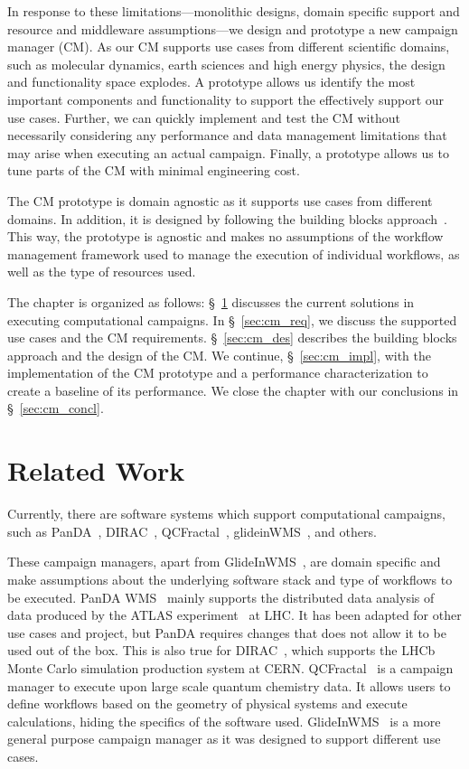 In response to these limitations---monolithic designs, domain specific support 
and resource and middleware assumptions---we design and prototype a new 
campaign manager (CM). As our CM supports use cases from 
different scientific domains, such as molecular dynamics, earth sciences and 
high energy physics, the design and functionality space explodes. A prototype 
allows us identify the most important components and functionality to support 
the effectively support our use cases. Further, we can quickly implement and 
test the CM without necessarily considering any performance and 
data management limitations that may arise when executing an actual campaign.
Finally, a prototype allows us to tune parts of the CM with 
minimal engineering cost.

The CM prototype is domain agnostic as it supports use cases 
from different domains. In addition, it is designed by following the building 
blocks approach~\cite{turilli2019middleware}. This way, the prototype is 
agnostic and makes no assumptions of the workflow management framework used to 
manage the execution of individual workflows, as well as the type of resources 
used.

The chapter is organized as follows: \S~\ref{sec:cm_rw} discusses the current
solutions in executing computational campaigns. In \S~\ref{sec:cm_req}, we discuss 
the supported use cases and the CM requirements. 
\S~\ref{sec:cm_des} describes the building blocks approach and the design 
of the CM. We continue, \S~\ref{sec:cm_impl}, with the 
implementation of the CM prototype and a performance 
characterization to create a baseline of its performance. We close the chapter 
with our conclusions in \S~\ref{sec:cm_concl}.

\section{Related Work}
\label{sec:cm_rw}
Currently, there are software systems which support computational campaigns, 
such as PanDA~\cite{maeno2008panda}, DIRAC~\cite{casajus2010dirac}, 
QCFractal~\cite{qcfractal}, glideinWMS~\cite{sfiligoi2008glidein}, and others.

These campaign managers, apart from GlideInWMS~\cite{sfiligoi2008glidein}, are 
domain specific and make assumptions about the underlying software stack and 
type of workflows to be executed. PanDA WMS~\cite{maeno2008panda} mainly 
supports the distributed data analysis of data produced by the ATLAS 
experiment~\cite{atlas} at LHC. It has been adapted for other use cases and 
project, but PanDA requires changes that does not allow it to be used out of 
the box. This is also true for DIRAC~\cite{tsaregorodtsev2003dirac}, which 
supports the LHCb Monte Carlo simulation production system at CERN.
QCFractal~\cite{qcfractal} is a campaign manager to execute upon large scale 
quantum chemistry data. It allows users to define workflows based on the 
geometry of physical systems and execute calculations, hiding the specifics of 
the software used. GlideInWMS~\cite{sfiligoi2008glidein} is a more general 
purpose campaign manager as it was designed to support different use cases.

